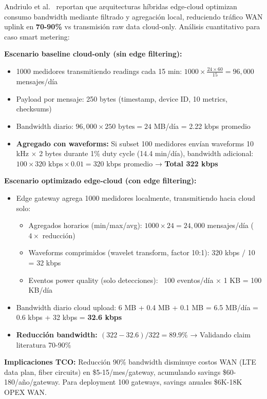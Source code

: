 Andriulo et al.~\cite{andriuloEdgeComputingCloud2024} reportan que arquitecturas híbridas edge-cloud optimizan consumo bandwidth mediante filtrado y agregación local, reduciendo tráfico WAN uplink en \textbf{70-90\%} vs transmisión raw data cloud-only. Análisis cuantitativo para caso smart metering:

\textbf{Escenario baseline cloud-only (sin edge filtering):}
\begin{itemize}
\item 1000 medidores transmitiendo readings cada 15 min: $1000 \times \frac{24 \times 60}{15} = 96,000$ mensajes/día
\item Payload por mensaje: 250 bytes (timestamp, device ID, 10 metrics, checksums)
\item Bandwidth diario: $96,000 \times 250\text{ bytes} = 24$ MB/día = 2.22 kbps promedio
\item \textbf{Agregado con waveforms:} Si subset 100 medidores envían waveforms 10 kHz $\times$ 2 bytes durante 1\% duty cycle (14.4 min/día), bandwidth adicional: $100 \times 320\text{ kbps} \times 0.01 = 320$ kbps promedio → \textbf{Total 322 kbps}
\end{itemize}

\textbf{Escenario optimizado edge-cloud (con edge filtering):}
\begin{itemize}
\item Edge gateway agrega 1000 medidores localmente, transmitiendo hacia cloud solo:
  \begin{itemize}
  \item Agregados horarios (min/max/avg): $1000 \times 24 = 24,000$ mensajes/día ($4\times$ reducción)
  \item Waveforms comprimidos (wavelet transform, factor 10:1): 320 kbps / 10 = 32 kbps
  \item Eventos power quality (solo detecciones): ~100 eventos/día $\times$ 1 KB = 100 KB/día
  \end{itemize}
\item Bandwidth diario cloud upload: 6 MB + 0.4 MB + 0.1 MB = 6.5 MB/día = 0.6 kbps + 32 kbps = \textbf{32.6 kbps}
\item \textbf{Reducción bandwidth: $(322 - 32.6) / 322 = 89.9\%$} → Validando claim literatura 70-90\%
\end{itemize}

\textbf{Implicaciones TCO:} Reducción 90\% bandwidth disminuye costos WAN (LTE data plan, fiber circuits) en \$5-15/mes/gateway, acumulando savings \$60-180/año/gateway. Para deployment 100 gateways, savings anuales \$6K-18K OPEX WAN.

